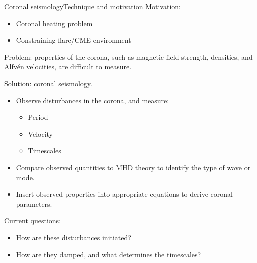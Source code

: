 \documentclass[table]{beamer}
\begin{document}
\begin{frame}{Coronal seismology}{Technique and motivation}
    Motivation:
    \begin{itemize}
        \item Coronal heating problem
        \item Constraining flare/CME environment
    \end{itemize}
    Problem: properties of the corona, such as magnetic field strength,
    densities, and Alfv\'en velocities, are difficult to measure.

    Solution: coronal seismology.
    \begin{itemize}
        \item Observe disturbances in the corona, and measure:
            \begin{itemize}
                \item Period
                \item Velocity
                \item Timescales
            \end{itemize}
        \item Compare observed quantities to MHD theory to identify the
            type of wave or mode.
        \item Insert observed properties into appropriate equations to
            derive coronal parameters.
    \end{itemize}
    Current questions:
    \begin{itemize}
        \item How are these disturbances initiated?
        \item How are they damped, and what determines the timescales?
    \end{itemize}
\end{frame}%
\end{document}
